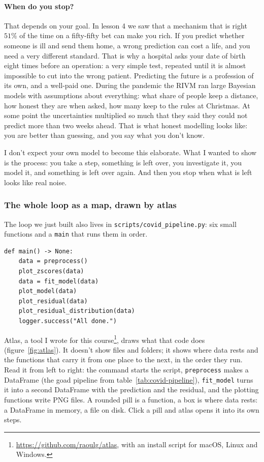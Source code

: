 \documentclass[12pt, a4paper]{article}
\theoremstyle{definition}
\theoremstyle{remark}
\begin{document}
\paragraph{When do you stop?}
That depends on your goal. In lesson 4 we saw that a mechanism that is right $51\%$ of the time on a fifty-fifty bet can make you rich. If you predict whether someone is ill and send them home, a wrong prediction can cost a life, and you need a very different standard. That is why a hospital asks your date of birth eight times before an operation: a very simple test, repeated until it is almost impossible to cut into the wrong patient. Predicting the future is a profession of its own, and a well-paid one. During the pandemic the RIVM ran large Bayesian models with assumptions about everything: what share of people keep a distance, how honest they are when asked, how many keep to the rules at Christmas. At some point the uncertainties multiplied so much that they said they could not predict more than two weeks ahead. That is what honest modelling looks like: you are better than guessing, and you say what you don't know.

I don't expect your own model to become this elaborate. What I wanted to show is the process: you take a step, something is left over, you investigate it, you model it, and something is left over again. And then you stop when what is left looks like real noise.

\subsubsection{The whole loop as a map, drawn by atlas}
The loop we just built also lives in \texttt{scripts/covid\_pipeline.py}: six small functions and a \texttt{main} that runs them in order.

\begin{verbatim}
def main() -> None:
    data = preprocess()
    plot_zscores(data)
    data = fit_model(data)
    plot_model(data)
    plot_residual(data)
    plot_residual_distribution(data)
    logger.success("All done.")
\end{verbatim}

Atlas, a tool I wrote for this course\footnote{\url{https://github.com/raoulg/atlas}, with an install script for macOS, Linux and Windows.}, draws what that code does (figure~\ref{fig:atlas}). It doesn't show files and folders; it shows where data rests and the functions that carry it from one place to the next, in the order they run. Read it from left to right: the command starts the script, \texttt{preprocess} makes a DataFrame (the goad pipeline from table~\ref{tab:covid-pipeline}), \texttt{fit\_model} turns it into a second DataFrame with the prediction and the residual, and the plotting functions write PNG files. A rounded pill is a function, a box is where data rests: a DataFrame in memory, a file on disk. Click a pill and atlas opens it into its own steps.
\end{document}
